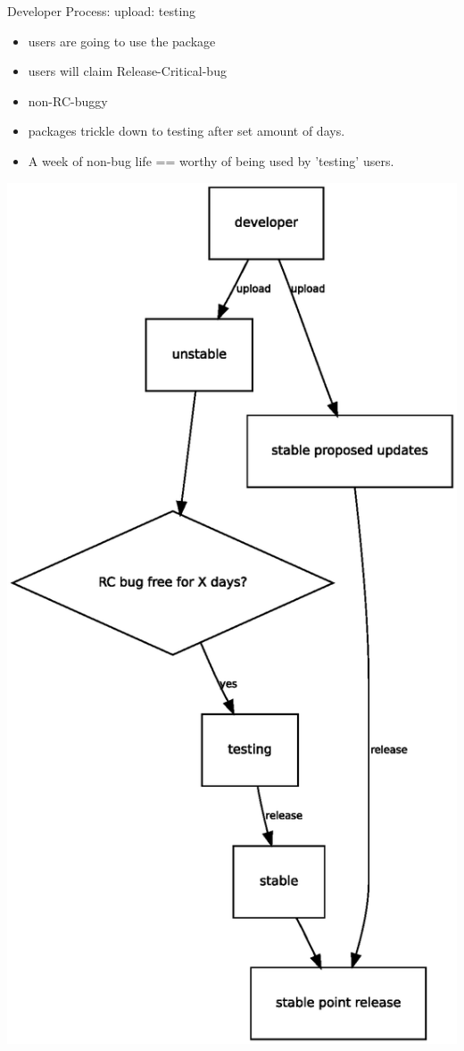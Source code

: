 \documentclass[cjk,dvipdfm,12pt]{beamer}
\begin{document}
\begin{frame}{Developer Process: upload: testing}

\begin{minipage}{0.5\hsize}
  \begin{itemize}
  \item users are going to use the package
  \item users will claim Release-Critical-bug
  \item non-RC-buggy
  \item packages trickle down to testing after set amount of days.
  \item A week of non-bug life == worthy of being used by 'testing' users.
 \end{itemize}
\end{minipage}
\begin{minipage}{0.4\hsize}
 \includegraphics[width=1\hsize]{image200805/testingcycle.eps}
\end{minipage}
\end{frame}
\end{document}
